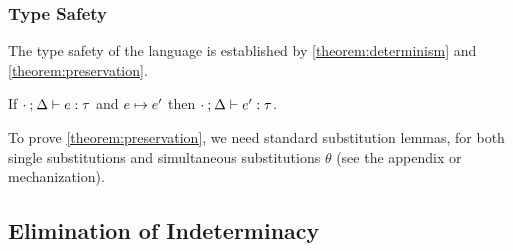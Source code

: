 \subsubsection{Type Safety}
The type safety of the language is established by
\autoref{theorem:determinism} and \autoref{theorem:preservation}.

\begin{theorem}[Preservation]
  \label{theorem:preservation}
  If $\cdot \mathbin{;} \Delta \vdash e : \tau$ and $e \mapsto e'$
  then $\cdot \mathbin{;} \Delta \vdash e' : \tau$.
\end{theorem}

% 


To prove \autoref{theorem:preservation}, we need standard substitution lemmas, for both single substitutions and simultaneous substitutions $\theta$ (see the appendix or mechanization).




\subsection{Elimination of Indeterminacy}\label{sec:algorithm}

